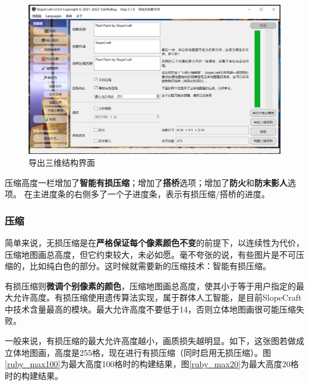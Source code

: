 \documentclass[UTF8]{ctexart}
\begin{document}
\begin{figure}[htbp]
    \centering
    \includegraphics[width=15cm]{Img2_Export3D.png}
    \caption{导出三维结构界面}
\end{figure}

压缩高度一栏增加了\textbf{智能有损压缩}；增加了\textbf{搭桥}选项；增加了\textbf{防火}和\textbf{防末影人}选项。 在主进度条的右侧多了一个子进度条，表示有损压缩/搭桥的进度。

\subsubsection{压缩}
简单来说，无损压缩是在\textbf{严格保证每个像素颜色不变}的前提下，以连续性为代价，压缩地图画总高度，但它约束较大，未必如愿。毫不夸张的说，有些图片是不可压缩的，比如纯白色的部分。这时候就需要新的压缩技术：智能有损压缩。

有损压缩则\textbf{微调个别像素的颜色}，压缩地图画总高度，使其小于等于用户指定的最大允许高度。有损压缩使用遗传算法实现，属于群体人工智能，是目前SlopeCraft中技术含量最高的模块。最大允许高度不要低于14，否则立体地图画很可能压缩失败。

一般来说，有损压缩的最大允许高度越小，画质损失越明显。如下，这张图若做成立体地图画，高度是255格，现在进行有损压缩（同时启用无损压缩）。图\ref*{ruby_max100}为最大高度100格时的构建结果，图\ref*{ruby_max20}为最大高度20格时的构建结果。
\end{document}
